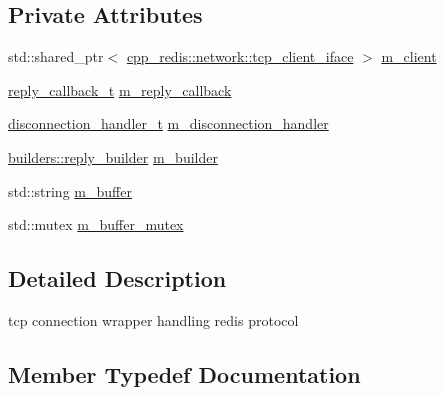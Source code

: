 \subsection*{Private Attributes}
\begin{DoxyCompactItemize}
\item 
std\+::shared\+\_\+ptr$<$ \hyperlink{classcpp__redis_1_1network_1_1tcp__client__iface}{cpp\+\_\+redis\+::network\+::tcp\+\_\+client\+\_\+iface} $>$ \hyperlink{classcpp__redis_1_1network_1_1redis__connection_afc7de86e5a397105f5c00c56400a0bfd}{m\+\_\+client}
\item 
\hyperlink{classcpp__redis_1_1network_1_1redis__connection_a40f4b55a3103b7436e34211893377245}{reply\+\_\+callback\+\_\+t} \hyperlink{classcpp__redis_1_1network_1_1redis__connection_a9e02ddcb9c3a82bbddc4dedb97f89527}{m\+\_\+reply\+\_\+callback}
\item 
\hyperlink{classcpp__redis_1_1network_1_1redis__connection_aba1a229a3d36a5540a80776ed0cf9a44}{disconnection\+\_\+handler\+\_\+t} \hyperlink{classcpp__redis_1_1network_1_1redis__connection_abd2b78a1df13fd04d0f50ee603c1fe8a}{m\+\_\+disconnection\+\_\+handler}
\item 
\hyperlink{classcpp__redis_1_1builders_1_1reply__builder}{builders\+::reply\+\_\+builder} \hyperlink{classcpp__redis_1_1network_1_1redis__connection_ab9b12c80e5b42e4ddc4474e7c7fb3681}{m\+\_\+builder}
\item 
std\+::string \hyperlink{classcpp__redis_1_1network_1_1redis__connection_a6db8b0685d9fda7ad58b9011caeaa52f}{m\+\_\+buffer}
\item 
std\+::mutex \hyperlink{classcpp__redis_1_1network_1_1redis__connection_a78212b9c1aa872ee0b322fcc3a995556}{m\+\_\+buffer\+\_\+mutex}
\end{DoxyCompactItemize}


\subsection{Detailed Description}
tcp connection wrapper handling redis protocol 

\subsection{Member Typedef Documentation}
\mbox{\label{classcpp__redis_1_1network_1_1redis__connection_aba1a229a3d36a5540a80776ed0cf9a44}} 
